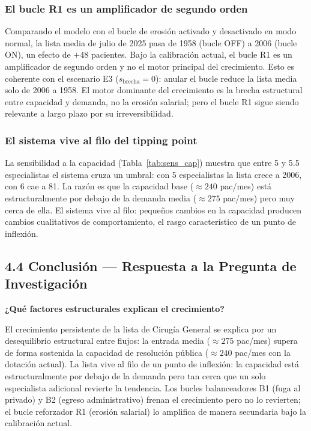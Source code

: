 \documentclass[12pt,a4paper]{article}
\begin{document}
\subsubsection*{El bucle R1 es un amplificador de segundo orden}

Comparando el modelo con el bucle de erosión activado y desactivado en modo normal, la lista media de julio de 2025 pasa de 1958 (bucle OFF) a 2006 (bucle ON), un efecto de $+48$ pacientes. Bajo la calibración actual, el bucle R1 es un amplificador de segundo orden y no el motor principal del crecimiento. Esto es coherente con el escenario E3 ($s_{\text{brecha}}=0$): anular el bucle reduce la lista media solo de 2006 a 1958. El motor dominante del crecimiento es la brecha estructural entre capacidad y demanda, no la erosión salarial; pero el bucle R1 sigue siendo relevante a largo plazo por su irreversibilidad.

\subsubsection*{El sistema vive al filo del tipping point}

La sensibilidad a la capacidad (Tabla~\ref{tab:sens_cap}) muestra que entre 5 y 5.5 especialistas el sistema cruza un umbral: con 5 especialistas la lista crece a 2006, con 6 cae a 81. La razón es que la capacidad base ($\approx 240$ pac/mes) está estructuralmente por debajo de la demanda media ($\approx 275$ pac/mes) pero muy cerca de ella. El sistema vive al filo: pequeños cambios en la capacidad producen cambios cualitativos de comportamiento, el rasgo característico de un punto de inflexión.

\subsection*{4.4 Conclusión — Respuesta a la Pregunta de Investigación}

\textbf{¿Qué factores estructurales explican el crecimiento?}

El crecimiento persistente de la lista de Cirugía General se explica por un desequilibrio estructural entre flujos: la entrada media ($\approx 275$ pac/mes) supera de forma sostenida la capacidad de resolución pública ($\approx 240$ pac/mes con la dotación actual). La lista vive al filo de un punto de inflexión: la capacidad está estructuralmente por debajo de la demanda pero tan cerca que un solo especialista adicional revierte la tendencia. Los bucles balanceadores B1 (fuga al privado) y B2 (egreso administrativo) frenan el crecimiento pero no lo revierten; el bucle reforzador R1 (erosión salarial) lo amplifica de manera secundaria bajo la calibración actual.
\end{document}
